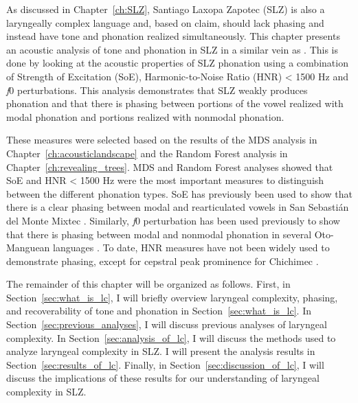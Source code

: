 As discussed in Chapter~\ref{ch:SLZ}, Santiago Laxopa Zapotec (SLZ) is also a laryngeally complex language and, based on  claim, should lack phasing and instead have tone and phonation realized simultaneously. This chapter presents an acoustic analysis of tone and phonation in SLZ in a similar vein as \citet{dicanioCoarticulationToneGlottal2012,garellekAcousticConsequencesPhonation2011,keltererPhonationTypeContrasts2020,wellerInteractionsToneGlottalization2023,wellerLexicalToneVowel2023,wellerVoiceQualityTone2024}. This is done by looking at the acoustic properties of SLZ phonation using a combination of Strength of Excitation (SoE), Harmonic-to-Noise Ratio (HNR) < 1500 Hz and \textit{f}0 perturbations. This analysis demonstrates that SLZ weakly produces phonation and that there is phasing between portions of the vowel realized with modal phonation and portions realized with nonmodal phonation.

These measures were selected based on the results of the MDS analysis in Chapter~\ref{ch:acousticlandscape} and the Random Forest analysis in Chapter~\ref{ch:revealing_trees}. MDS and Random Forest analyses showed that SoE and HNR < 1500 Hz were the most important measures to distinguish between the different phonation types. SoE has previously been used to show that there is a clear phasing between modal and rearticulated vowels in San Sebastián del Monte Mixtec \citep{wellerInteractionsToneGlottalization2023,wellerLexicalToneVowel2023,wellerVoiceQualityTone2024}. Similarly, \textit{f}0 perturbation has been used previously to show that there is phasing between modal and nonmodal phonation in several Oto-Manguean languages \citep{garellekAcousticConsequencesPhonation2011,dicanioCoarticulationToneGlottal2012,keltererPhonationTypeContrasts2020}. To date, HNR measures have not been widely used to demonstrate phasing, except for cepstral peak prominence for Chichimec \citep{keltererPhonationTypeContrasts2020}. 

The remainder of this chapter will be organized as follows. First, in Section~\ref{sec:what_is_lc}, I will briefly overview laryngeal complexity, phasing, and recoverability of tone and phonation in Section~\ref{sec:what_is_lc}. In Section~\ref{sec:previous_analyses}, I will discuss previous analyses of laryngeal complexity. In Section~\ref{sec:analysis_of_lc}, I will discuss the methods used to analyze laryngeal complexity in SLZ. I will present the analysis results in Section~\ref{sec:results_of_lc}. Finally, in Section~\ref{sec:discussion_of_lc}, I will discuss the implications of these results for our understanding of laryngeal complexity in SLZ.

